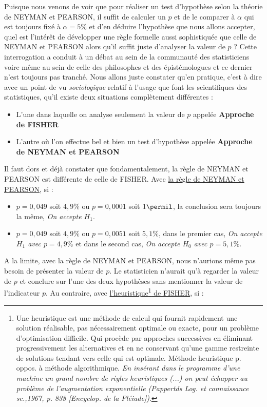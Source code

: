 Puisque nous venons de voir que pour réaliser un test d'hypothèse selon la théorie de NEYMAN et PEARSON, il suffit de calculer un $p$ et de le comparer à $\alpha$ qui est toujours fixé à $\alpha = 5\%$ et d'en déduire l'hypothèse que nous allons accepter, quel est l'intérêt de développer une règle formelle aussi sophistiquée que celle de NEYMAN et PEARSON alors qu'il suffit juste d'analyser la valeur de $p$ ?\newline
Cette interrogation a conduit à un débat au sein de la communauté des statisticiens voire même au sein de celle des philosophes et des épistémologues et ce dernier n'est toujours pas tranché.\newline
Nous allons juste constater qu'en pratique, c'est à dire avec un point de vu \textit{sociologique} relatif à l'usage que font les scientifiques des statistiques, qu'il existe deux situations complètement différentes : 
\begin{itemize}
\item L'une dans laquelle on analyse seulement la valeur de $p$ appelée \textbf{Approche de FISHER}
\item L'autre où l'on effectue bel et bien un test d'hypothèse appelée \textbf{Approche de NEYMAN et PEARSON}
\end{itemize} 
Il faut dors et déjà constater que fondamentalement, la règle de NEYMAN et PEARSON est différente de celle de FISHER.\newline
Avec \underline{la règle de NEYMAN et PEARSON}, si :
\begin{itemize}
\item $p=0,049$ soit $4,9\%$ ou $p= 0,0001$ soit $1\permil$, la conclusion sera toujours la même, \textit{On accepte $H_{1}$}.
\item $p=0,049$ soit $4,9\%$ ou $p= 0,0051$ soit $5,1\%$, dans le premier cas, \textit{On accepte $H_{1}$ avec $p = 4,9\%$} et dans le second cas, \textit{On accepte $H_{0}$ avec $p = 5,1\%$}.
\end{itemize}   
A la limite, avec la règle de NEYMAN et PEARSON, nous n'aurions même pas besoin de présenter la valeur de $p$. Le statisticien n'aurait qu'à regarder la valeur de $p$ et conclure sur l'une des deux hypothèses sans mentionner la valeur de l'indicateur $p$.\newline
Au contraire, avec \underline{l'heuristique\footnote{Une heuristique est une méthode de calcul qui fournit rapidement une solution réalisable, pas nécessairement optimale ou exacte, pour un problème d'optimisation difficile. Qui procède par approches successives en éliminant progressivement les alternatives et en ne conservant qu'une gamme restreinte de solutions tendant vers celle qui est optimale. Méthode heuristique p. oppos. à méthode algorithmique. \textit{En insérant dans le programme d'une machine un grand nombre de règles heuristiques (...) on peut échapper au problème de l'augmentation exponentielle (Pappertds Log. et connaissance sc.,1967, p. 838 [Encyclop. de la Pléiade])}.} de FISHER}, si : 

